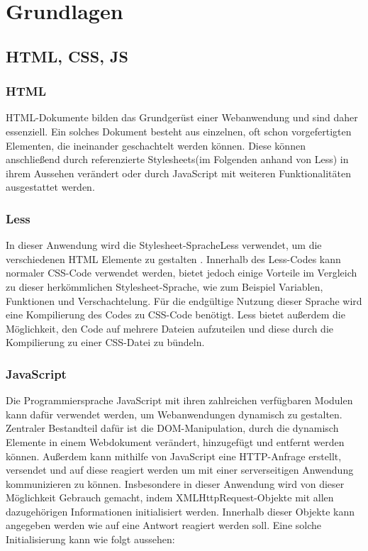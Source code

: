 \chapter{Grundlagen}

\section{HTML, CSS, JS}
\subsection{HTML}
HTML-Dokumente bilden das Grundgerüst einer Webanwendung und sind daher essenziell. Ein solches Dokument besteht aus einzelnen, oft schon vorgefertigten Elementen, die ineinander geschachtelt werden können. Diese können anschließend durch referenzierte \glqq Stylesheets\grqq \thinspace(im Folgenden anhand von Less) in ihrem Aussehen verändert oder durch JavaScript mit weiteren Funktionalitäten ausgestattet werden.

\subsection{Less}
In dieser Anwendung wird die \glqq Stylesheet-Sprache\grqq \thinspace Less verwendet, um die verschiedenen HTML Elemente zu gestalten \cite{less:listing}. Innerhalb des Less-Codes kann normaler CSS-Code verwendet werden, bietet jedoch einige Vorteile im Vergleich zu dieser herkömmlichen Stylesheet-Sprache, wie zum Beispiel Variablen, Funktionen und Verschachtelung. Für die endgültige Nutzung dieser Sprache wird eine Kompilierung des Codes zu CSS-Code benötigt. Less bietet außerdem die Möglichkeit, den Code auf mehrere Dateien aufzuteilen und diese durch die Kompilierung zu einer CSS-Datei zu bündeln.

\subsection{JavaScript}
Die Programmiersprache JavaScript mit ihren zahlreichen verfügbaren Modulen kann dafür verwendet werden, um Webanwendungen dynamisch zu gestalten. Zentraler Bestandteil dafür ist die \glqq DOM-Manipulation\grqq , durch die dynamisch Elemente in einem Webdokument verändert, hinzugefügt und entfernt werden können. Außerdem kann mithilfe von JavaScript eine HTTP-Anfrage erstellt, versendet und auf diese reagiert werden um mit einer serverseitigen Anwendung kommunizieren zu können. Insbesondere in dieser Anwendung wird von dieser Möglichkeit Gebrauch gemacht, indem \glqq XMLHttpRequest\grqq-Objekte mit allen dazugehörigen Informationen initialisiert werden. Innerhalb dieser Objekte kann angegeben werden wie auf eine Antwort reagiert werden soll. Eine solche Initialisierung kann wie folgt aussehen:

